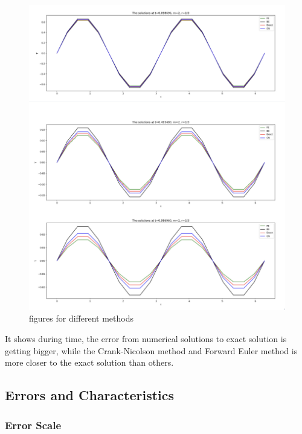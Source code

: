 \documentclass[12pt]{article}
\begin{document}
\begin{figure}[H] 
\centering 
\includegraphics[scale=0.25]{figures for c.jpg} 
\caption{figures for different methods} 
\label{TDMA Solver code} 
\end{figure}



It shows during time, the error from numerical solutions to exact solution is getting bigger, while the Crank-Nicolson method and Forward Euler method is more closer to the exact solution than others.












\subsection{Errors and Characteristics}
\subsubsection{Error Scale}
\end{document}
